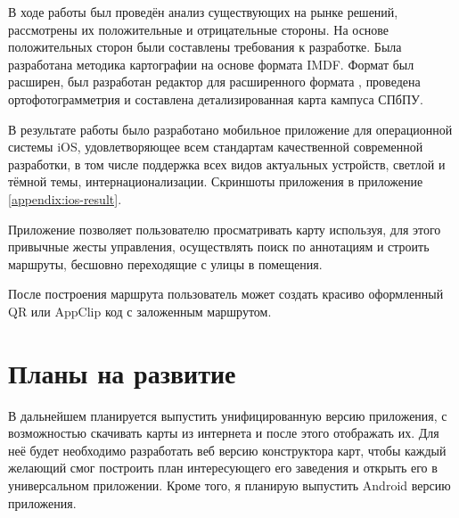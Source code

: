 В ходе работы был проведён анализ существующих на рынке решений, рассмотрены их положительные и отрицательные стороны. На основе положительных сторон были составлены требования к разработке. Была разработана методика картографии на основе формата IMDF. Формат был расширен, был разработан редактор для расширенного формата , проведена ортофотограмметрия  и составлена детализированная карта кампуса СПбПУ.

В результате работы было разработано мобильное приложение для операционной системы iOS, удовлетворяющее всем стандартам качественной современной разработки, в том числе поддержка всех видов актуальных устройств, светлой и тёмной темы, интернационализации. Скриншоты приложения в приложение \ref{appendix:ios-result}.

Приложение позволяет пользователю просматривать карту используя, для этого привычные жесты управления, осуществлять поиск по аннотациям и строить маршруты, бесшовно переходящие с улицы в помещения.

После построения маршрута пользователь может создать красиво оформленный QR или AppClip код с заложенным маршрутом.


\section*{Планы на развитие}
  В дальнейшем планируется выпустить унифицированную версию приложения, с возможностью скачивать карты из интернета и после этого отображать их. Для неё будет необходимо разработать веб версию конструктора карт, чтобы каждый желающий смог построить план интересующего его заведения и открыть его в универсальном приложении. Кроме того, я планирую выпустить Android версию приложения.
